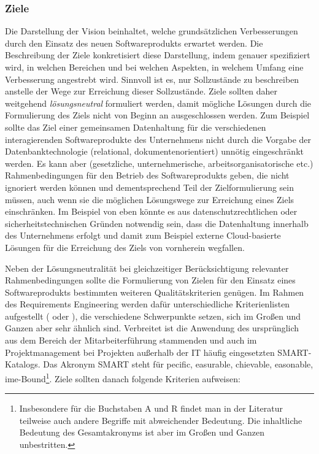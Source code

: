 \subsubsection{Ziele}
\label{sec:Kap-6.1.2.2}

Die Darstellung der Vision beinhaltet, welche grundsätzlichen Verbesserungen durch den Einsatz des neuen Softwareprodukts erwartet werden. Die Beschreibung der Ziele konkretisiert diese Darstellung, indem genauer spezifiziert wird, in welchen Bereichen und bei welchen Aspekten, in welchem Umfang eine Verbesserung angestrebt wird. Sinnvoll ist es, nur Sollzustände zu beschreiben anstelle der Wege zur Erreichung dieser Sollzustände.  Ziele sollten daher weitgehend \textit{lösungsneutral} formuliert werden, damit mögliche Lösungen durch die Formulierung des Ziels nicht von Beginn an ausgeschlossen werden. Zum Beispiel sollte das Ziel einer gemeinsamen Datenhaltung für die verschiedenen interagierenden Softwareprodukte des Unternehmens nicht durch die Vorgabe der Datenbanktechnologie (\zb relational, dokumenten\-orientiert) unnötig eingeschränkt werden. Es kann aber (gesetzliche, unternehmerische, arbeits\-organisa\-torische etc.) Rahmenbedingungen für den Betrieb des Softwareprodukts geben, die nicht ignoriert werden können und dementsprechend Teil der Ziel\-formulierung sein müssen, auch wenn sie die möglichen Lösungswege zur Erreichung eines Ziels einschränken. Im Beispiel von eben könnte es aus datenschutzrechtlichen oder sicherheitstechnischen Gründen notwendig sein, dass die Datenhaltung innerhalb des Unternehmens erfolgt und damit zum Beispiel externe Cloud-basierte Lösungen für die Erreichung des Ziels von vornherein wegfallen.

Neben der Lösungsneutralität bei gleichzeitiger Berücksichtigung relevanter Rahmen\-bedingungen sollte die Formulierung von Zielen für den Einsatz eines Software\-produkts bestimmten weiteren Qualitätskriterien genügen. Im Rahmen des Require\-ments Engineering werden dafür unterschiedliche Kriterienlisten aufgestellt (\zb \cite[S. 26 und S. 84]{rup14} oder \cite[457 \psqq]{bal09}), die verschiedene Schwer\-punkte setzen, sich im Großen und Ganzen aber sehr ähnlich sind. Verbreitet ist die Anwendung des ursprünglich aus dem Bereich der Mitarbeiterführung stammenden und auch im Projektmanagement bei Projekten außerhalb der IT häufig eingesetzten SMART-Katalogs. Das Akronym SMART 
steht für \textbf{}pecific, \textbf{}easurable, \textbf{}chievable, \textbf{}easonable, \textbf{}ime-Bound\footnote{Insbesondere für die Buchstaben A und R findet man in der Literatur teilweise auch andere Begriffe mit abweichender Bedeutung. Die inhaltliche Bedeutung des Gesamtakronyms ist aber im Großen und Ganzen unbestritten.}.  Ziele sollten danach folgende Kriterien aufweisen:

